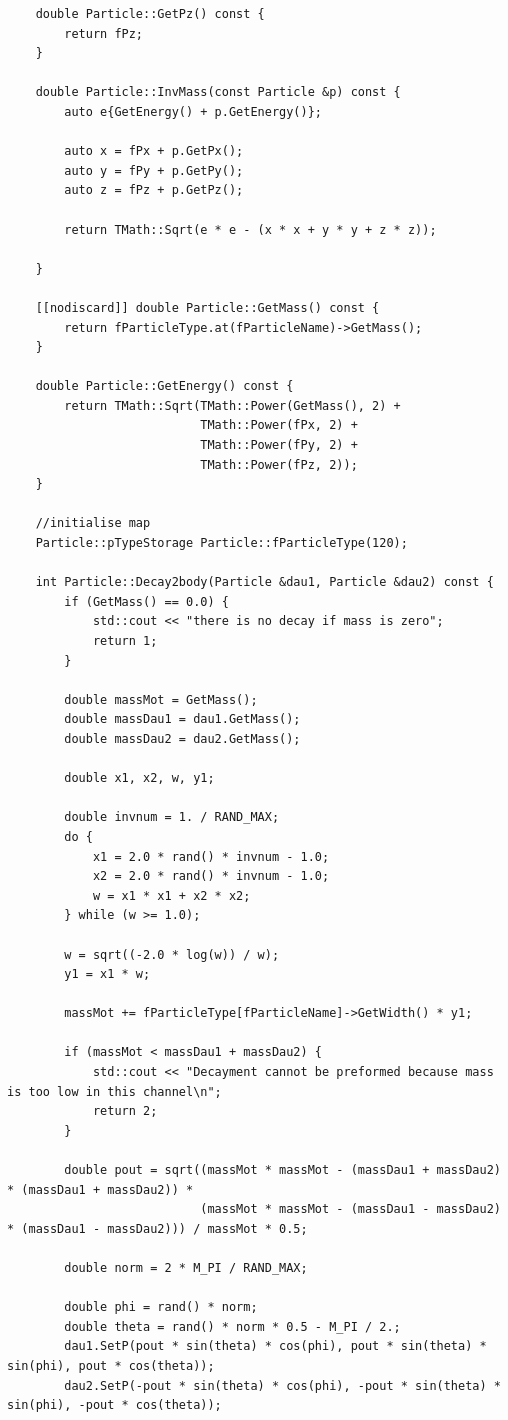 \documentclass[12pt, a4paper]{article}
\begin{document}
\begin{verbatim}
    double Particle::GetPz() const {
        return fPz;
    }

    double Particle::InvMass(const Particle &p) const {
        auto e{GetEnergy() + p.GetEnergy()};

        auto x = fPx + p.GetPx();
        auto y = fPy + p.GetPy();
        auto z = fPz + p.GetPz();

        return TMath::Sqrt(e * e - (x * x + y * y + z * z));

    }

    [[nodiscard]] double Particle::GetMass() const {
        return fParticleType.at(fParticleName)->GetMass();
    }

    double Particle::GetEnergy() const {
        return TMath::Sqrt(TMath::Power(GetMass(), 2) +
                           TMath::Power(fPx, 2) +
                           TMath::Power(fPy, 2) +
                           TMath::Power(fPz, 2));
    }

    //initialise map
    Particle::pTypeStorage Particle::fParticleType(120);

    int Particle::Decay2body(Particle &dau1, Particle &dau2) const {
        if (GetMass() == 0.0) {
            std::cout << "there is no decay if mass is zero";
            return 1;
        }

        double massMot = GetMass();
        double massDau1 = dau1.GetMass();
        double massDau2 = dau2.GetMass();

        double x1, x2, w, y1;

        double invnum = 1. / RAND_MAX;
        do {
            x1 = 2.0 * rand() * invnum - 1.0;
            x2 = 2.0 * rand() * invnum - 1.0;
            w = x1 * x1 + x2 * x2;
        } while (w >= 1.0);

        w = sqrt((-2.0 * log(w)) / w);
        y1 = x1 * w;

        massMot += fParticleType[fParticleName]->GetWidth() * y1;

        if (massMot < massDau1 + massDau2) {
            std::cout << "Decayment cannot be preformed because mass is too low in this channel\n";
            return 2;
        }

        double pout = sqrt((massMot * massMot - (massDau1 + massDau2) * (massDau1 + massDau2)) *
                           (massMot * massMot - (massDau1 - massDau2) * (massDau1 - massDau2))) / massMot * 0.5;

        double norm = 2 * M_PI / RAND_MAX;

        double phi = rand() * norm;
        double theta = rand() * norm * 0.5 - M_PI / 2.;
        dau1.SetP(pout * sin(theta) * cos(phi), pout * sin(theta) * sin(phi), pout * cos(theta));
        dau2.SetP(-pout * sin(theta) * cos(phi), -pout * sin(theta) * sin(phi), -pout * cos(theta));


\end{verbatim}
\end{document}

